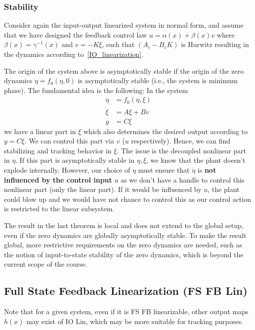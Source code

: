 \subsubsection{Stability}

Consider again the input-output linearized system in normal form, and assume that we have designed the feedback control law $u = \alpha(x) + \beta(x)v$ where $\beta(x) = \gamma^{-1}(x)$ and $v = -K \xi$, such that $(A_c - B_c K)$ is Hurwitz resulting in the dynamics according to~\ref{IO_linearization}.

\newpar{}
\label{stab_cond}

The origin of the system above is asymptotically stable if the origin of the zero dynamics $\dot{\eta} = f_0(\eta, 0)$ is asymptotically stable (i.e., the system is minimum phase).
\newpar{}
The fundamental idea is the following: In the system
\begin{align*}
    \dot{\eta} & = f_0(\eta, \xi) \\
    \dot{\xi}  & = A\xi + Bv      \\
    y          & = C\xi
\end{align*}
we have a linear part in $\xi$ which also determines the desired output according to $y = C\xi$. We can control this part via $v$ ($u$ respectively). Hence, we can find stabilizing and tracking behavior in $\xi$. The issue is the decoupled nonlinear part in $\eta$. If this part is asymptotically stable in $\eta, \xi$, we know that the plant doesn't explode internally. However, our choice of $\eta$ must ensure that $\dot{\eta}$ is \textbf{not influenced by the control input} $u$ as we don't have a handle to control this nonlinear part (only the linear part). If it would be influenced by $u$, the plant could blow up and we would have not chance to control this as our control action is restricted to the linear subsystem.

\newpar{}

The result in the last theorem is local and does not extend to the global setup, even if the zero dynamics are globally asymptotically stable. To make the result global, more restrictive requirements on the zero dynamics are needed, such as the notion of input-to-state stability of the zero dynamics, which is beyond the current scope of the course.


\subsection{Full State Feedback Linearization (FS FB Lin)}
Note that for a given system, even if it is FS FB linearizable, other output maps $h(x)$ may exist of IO Lin, which may be more suitable for tracking purposes.
